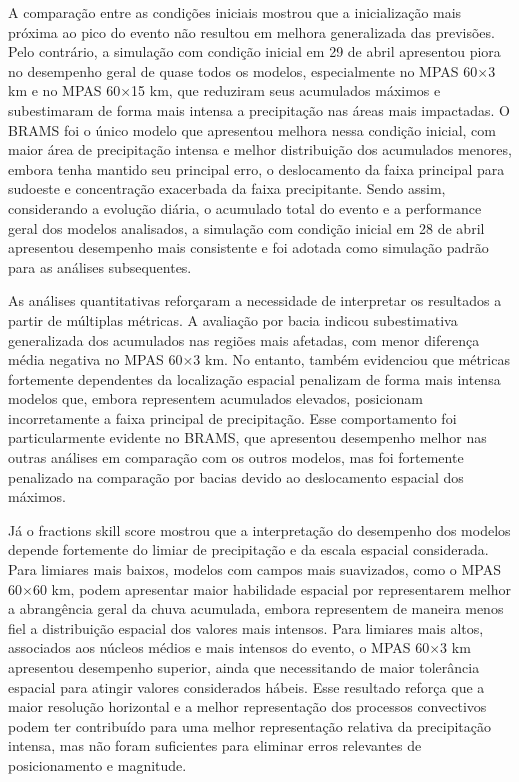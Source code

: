 \documentclass[12pt,a4paper,oneside]{book}
\begin{document}
A comparação entre as condições iniciais mostrou que a inicialização mais próxima ao pico do evento não resultou em melhora generalizada das previsões. Pelo contrário, a simulação com condição inicial em 29 de abril apresentou piora no desempenho geral de quase todos os modelos, especialmente no MPAS 60$\times$3 km e no MPAS 60$\times$15 km, que reduziram seus acumulados máximos e subestimaram de forma mais intensa a precipitação nas áreas mais impactadas. O BRAMS foi o único modelo que apresentou melhora nessa condição inicial, com maior área de precipitação intensa e melhor distribuição dos acumulados menores, embora tenha mantido seu principal erro, o deslocamento da faixa principal para sudoeste e concentração exacerbada da faixa precipitante. Sendo assim, considerando a evolução diária, o acumulado total do evento e a performance geral dos modelos analisados, a simulação com condição inicial em 28 de abril apresentou desempenho mais consistente e foi adotada como simulação padrão para as análises subsequentes.

As análises quantitativas reforçaram a necessidade de interpretar os resultados a partir de múltiplas métricas. A avaliação por bacia indicou subestimativa generalizada dos acumulados nas regiões mais afetadas, com menor diferença média negativa no MPAS 60$\times$3 km. No entanto, também evidenciou que métricas fortemente dependentes da localização espacial penalizam de forma mais intensa modelos que, embora representem acumulados elevados, posicionam incorretamente a faixa principal de precipitação. Esse comportamento foi particularmente evidente no BRAMS, que apresentou desempenho melhor nas outras análises em comparação com os outros modelos, mas foi fortemente penalizado na comparação por bacias devido ao deslocamento espacial dos máximos.

Já o fractions skill score mostrou que a interpretação do desempenho dos modelos depende fortemente do limiar de precipitação e da escala espacial considerada. Para limiares mais baixos, modelos com campos mais suavizados, como o MPAS 60$\times$60 km, podem apresentar maior habilidade espacial por representarem melhor a abrangência geral da chuva acumulada, embora representem de maneira menos fiel a distribuição espacial dos valores mais intensos. Para limiares mais altos, associados aos núcleos médios e mais intensos do evento, o MPAS 60$\times$3 km apresentou desempenho superior, ainda que necessitando de maior tolerância espacial para atingir valores considerados hábeis. Esse resultado reforça que a maior resolução horizontal e a melhor representação dos processos convectivos podem ter contribuído para uma melhor representação relativa da precipitação intensa, mas não foram suficientes para eliminar erros relevantes de posicionamento e magnitude.
\end{document}
